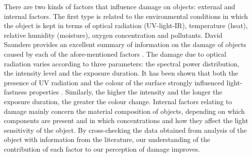 There are two kinds of factors that influence damage on objects: external and internal factors. The first type is related to the environmental conditions in which the object is kept in terms of optical radiation (\acrshort{UV}-light-\acrshort{IR}), temperature (heat), relative humidity (moisture), oxygen concentration and pollutants. David Saunders provides an excellent summary of information on the damage of objects caused by each of the afore-mentioned factors \citep[Chapter 4, p.81-124]{saunders_museum_2020}. The damage due to optical radiation varies according to three parameters: the spectral power distribution, the intensity level and the exposure duration. It has been shown that both the presence of \gls{UV} radiation \citep{harrison_report_1953, mclaren_spectral_1956,padfield_control_1966} and the colour of the surface strongly influenced light-fastness properties \citep{saunders_light-induced_1994}. Similarly, the higher the intensity and the longer the exposure duration, the greater the colour change. Internal factors relating to damage mainly concern the material composition of objects, depending on which components are present and in which concentrations and how they affect the light sensitivity of the object. By cross-checking the data obtained from analysis of the object with information from the literature, our understanding of the contribution of each factor to our perception of damage improves.\\


